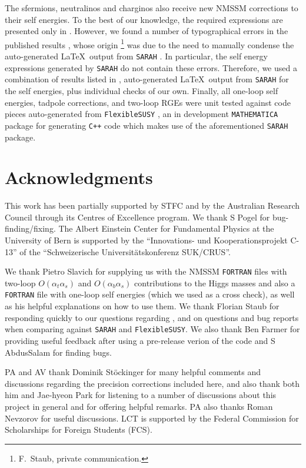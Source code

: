 \documentclass[final,3p,times]{elsarticle}
\def\at{\alpha_t}
\def\ab{\alpha_b}
\def\as{\alpha_s}
\def\oatas{O(\at\as)}
\def\oabas{O(\ab\as)}
\begin{document}
The sfermions, neutralinos and charginos also receive new NMSSM corrections to 
their self energies. To the best of our knowledge, the required expressions are 
presented only in \cite{Staub:2010ty}. However, we found a number of 
typographical errors in the published results \cite{Staub:2010ty}, whose 
origin%
\footnote{F.~Staub, private communication.} 
was due to the need to manually condense the auto-generated \LaTeX~output from 
{\tt SARAH} \cite{Staub:2009bi,Staub:2010jh,Staub:2012pb,Staub:2013tta}.  In 
particular, the self energy expressions generated by {\tt SARAH} do not contain 
these errors. Therefore, we used a combination of results listed in 
\cite{Staub:2010ty}, auto-generated \LaTeX~output from {\tt SARAH} for the self 
energies, plus individual checks of our own.
Finally, all one-loop self energies, tadpole corrections, and two-loop RGEs were
 unit tested against code pieces auto-generated from {\tt FlexibleSUSY} 
\cite{flexi-susy}, an in development {\tt MATHEMATICA} package for generating 
{\tt C++} code which makes use of the aforementioned {\tt SARAH} package. 


\section*{Acknowledgments}
This work has been partially supported by STFC 
and by the Australian Research Council through its Centres of Excellence 
program. We thank S Pogel for bug-finding/fixing.
The Albert Einstein Center for Fundamental Physics at the University 
of Bern is supported by the ``Innovations- und Kooperationsprojekt C-13'' of the
 ``Schweizerische Universit\"{a}tskonferenz SUK/CRUS''.

We thank Pietro Slavich for supplying us with the NMSSM {\tt FORTRAN} files with
two-loop $\oatas$ and $\oabas$ contributions to the Higgs masses and also a
{\tt FORTRAN} file with one-loop self energies (which we used as a cross check),
 as well as his helpful explanations on how to use them. We thank Florian 
Staub for responding quickly to our questions regarding \cite{Staub:2010ty}, and
 on questions and bug reports when comparing against {\tt SARAH} and 
{\tt FlexibleSUSY}. We also thank Ben Farmer for providing useful feedback after
 using a pre-release verion of the code and S AbdusSalam for finding bugs. 

PA and AV thank Dominik St\"ockinger for many helpful comments and discussions 
regarding the precision corrections included here, and also thank both him and 
Jae-hyeon Park for listening to a number of discussions about this project in 
general and for offering helpful remarks. PA also thanks Roman Nevzorov for 
useful discussions.  LCT is supported by the Federal Commission for Scholarships
 for Foreign Students (FCS).  
\end{document}
